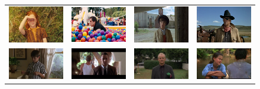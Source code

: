 \begin{figure}
\begin{center}
\begin{tabular}{cccc}
\includegraphics[width=0.15\linewidth]
  {fig/clust/05.jpg} 
& \includegraphics[width=0.15\linewidth]
  {fig/clust/07.jpg}  
& \includegraphics[width=0.15\linewidth]
  {fig/clust/13.jpg}   
& \includegraphics[width=0.15\linewidth]
  {fig/clust/14.jpg}
\\
\includegraphics[width=0.15\linewidth]
  {fig/clust/01.jpg} 
& \includegraphics[width=0.15\linewidth]
  {fig/clust/06.jpg}  
& \includegraphics[width=0.15\linewidth]
  {fig/clust/02.jpg}   
& \includegraphics[width=0.15\linewidth]
  {fig/clust/08.jpg}
\\


\end{tabular}
\end{center}
\end{figure}
